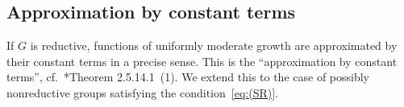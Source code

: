 \documentclass[letterpaper,11pt]{amsart}
\newcommand{\fa}{\mathfrak{a}}
\newcommand{\fg}{\mathfrak{g}}
\newcommand{\fX}{\mathfrak{X}}
\newcommand{\bA}{\mathbb{A}}
\newcommand{\cB}{\mathcal{B}}
\newcommand{\cP}{\mathcal{P}}
\newcommand{\cS}{\mathcal{S}}
\newcommand{\cU}{\mathcal{U}}
\newcommand{\rd}{\mathrm{d}}
\newcommand{\<}{\negthickspace}
\providecommand{\abs}[1]{\lvert#1\rvert}
\providecommand{\aabs}[1]{\lVert#1\rVert}
\providecommand{\Abs}[1]{\left\lvert#1\right\rvert}
\theoremstyle{definition}
\theoremstyle{plain}
\newtheorem{lemma}[definition]{Lemma}
\theoremstyle{remark}
\newtheorem{remark}[definition]{Remark}
\numberwithin{equation}{section}
\begin{document}

\subsection{Approximation by constant terms}
If $G$ is reductive, functions of uniformly moderate growth are approximated
by their constant terms in a precise sense. This is the ``approximation by
constant terms'', cf.~\cite{BPCZ}*{Theorem 2.5.14.1~(1)}. We extend this to
the case of possibly nonreductive groups satisfying the
condition~\eqref{eq:(SR)}.
\end{document}
